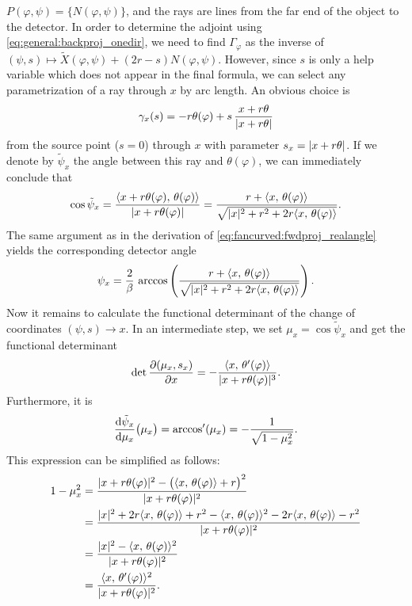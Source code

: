 \documentclass{amsart}
\renewcommand*{\phi}{\varphi}
\begin{document}
$P(\phi,\psi) = \lbrace N(\phi,\psi)\rbrace$, and the rays are lines from the far end of the object to the detector. In order to determine 
the adjoint using \eqref{eq:general:backproj_onedir}, we need to find $\Gamma_\phi$ as the inverse of 
$(\psi, s) \mapsto \tilde X(\phi, \psi) + (2r - s) N(\phi,\psi)$. However, since $s$ is only a help variable which does not appear in the 
final formula, we can select any parametrization of a ray through $x$ by arc length. An obvious choice is
%
\begin{equation*}
 \gamma_x(s) = -r \theta(\phi) + s\, \frac{x + r\theta}{\ABS{x + r\theta}}
\end{equation*}
%
from the source point ($s=0$) through $x$ with parameter $s_x=|x + r\theta|$. If we denote by $\tilde\psi_x$ the angle between this 
ray and  $\theta(\phi)$, we can immediately conclude that
%
\begin{equation*}
 \cos \tilde\psi_x = \frac{\INNER{x + r\theta(\phi)}{\theta(\phi)}}{\ABS{x + r\theta(\phi)}} 
 = \frac{r + \INNER{x}{\theta(\phi)}}{\sqrt{\ABS{x}^2 + r^2 + 2r \INNER{x}{\theta(\phi)}}}.
\end{equation*}
%
The same argument as in the derivation of \eqref{eq:fancurved:fwdproj_realangle} yields the corresponding detector angle
%
\begin{equation}
 \label{eq:fancurved:psi_x}
 \psi_x = \frac{2}{\beta}\, \arccos\left( \frac{r + \INNER{x}{\theta(\phi)}}{\sqrt{\ABS{x}^2 + r^2 + 2r \INNER{x}{\theta(\phi)}}} \right).
\end{equation}
%
Now it remains to calculate the functional determinant of the change of coordinates $(\psi, s) \to x$. In an intermediate step, we set 
$\mu_x = \cos \tilde\psi_x$ and get the functional determinant
%
\begin{equation*}
 \DET \frac{\partial(\mu_x, s_x)}{\partial x} = - \frac{\INNER{x}{\theta'(\phi)}}{\ABS{x + r \theta(\phi)}^3}.
\end{equation*}
%
Furthermore, it is
%
\begin{equation*}
 \frac{\mathrm{d} \tilde\psi_x}{\mathrm{d} \mu_x}\big(\mu_x\big) = \arccos'(\mu_x) = - \frac{1}{\sqrt{1 - \mu_x^2}}.
\end{equation*}
%
This expression can be simplified as follows:
%
\begin{align*}
 1 - \mu_x^2 
 &= \frac{\ABS{x + r\theta(\phi)}^2 - \big(\INNER{x}{\theta(\phi)} + r\big)^2}{\ABS{x + r\theta(\phi)}^2} \\
 &= \frac{\ABS{x}^2 + 2r \INNER{x}{\theta(\phi)} + r^2 - \INNER{x}{\theta(\phi)}^2 - 2r\INNER{x}{\theta(\phi)} - r^2}{\ABS{x + 
 r\theta(\phi)}^2} \\
 &= \frac{\ABS{x}^2 - \INNER{x}{\theta(\phi)}^2}{\ABS{x + r\theta(\phi)}^2} \\
 &= \frac{\INNER{x}{\theta'(\phi)}^2}{\ABS{x + r\theta(\phi)}^2}.
\end{align*}
\end{document}
